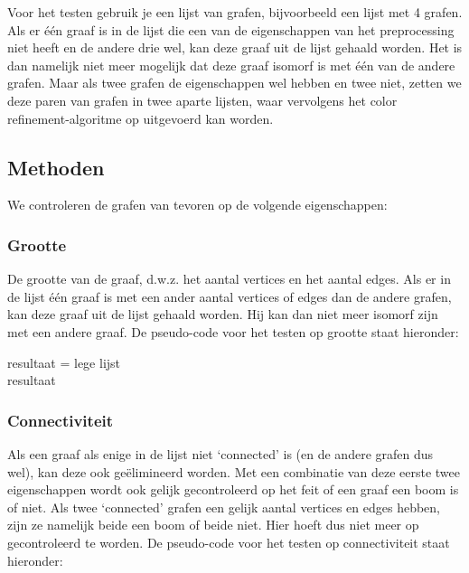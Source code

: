 \documentclass{article}
\begin{document}
Voor het testen gebruik je een lijst van grafen, bijvoorbeeld een lijst met 4 grafen. Als er \'e\'en graaf is in de lijst die een van de eigenschappen van het preprocessing niet heeft en de andere drie wel, kan deze graaf uit de lijst gehaald worden. Het is dan namelijk niet meer mogelijk dat deze graaf isomorf is met \'e\'en van de andere grafen. Maar als twee grafen de eigenschappen wel hebben en twee niet, zetten we deze paren van grafen in twee aparte lijsten, waar vervolgens het color refinement-algoritme op uitgevoerd kan worden.

\subsection{Methoden}
We controleren de grafen van tevoren op de volgende eigenschappen:
\subsubsection{Grootte}
De grootte van de graaf, d.w.z. het aantal vertices en het aantal edges. Als er in de lijst één graaf is met een ander aantal vertices of edges dan de andere grafen, kan deze graaf uit de lijst gehaald worden. Hij kan dan niet meer isomorf zijn met een andere graaf. De pseudo-code voor het testen op grootte staat hieronder:\\

\begin{algorithm}[H]
	resultaat = lege lijst\\
	\Return resultaat
\end{algorithm}

\subsubsection{Connectiviteit}
Als een graaf als enige in de lijst niet ‘connected’ is (en de andere grafen dus wel), kan deze ook ge\"elimineerd worden. Met een combinatie van deze eerste twee eigenschappen wordt ook gelijk gecontroleerd op het feit of een graaf een boom is of niet. Als twee ‘connected’ grafen een gelijk aantal vertices en edges hebben, zijn ze namelijk beide een boom of beide niet. Hier hoeft dus niet meer op gecontroleerd te worden. De pseudo-code voor het testen op connectiviteit staat hieronder:\\
\end{document}
